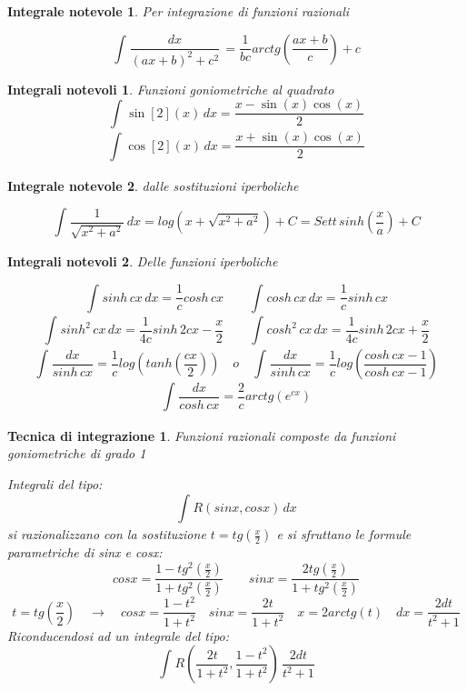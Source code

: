 \documentclass[a4paper, titlepage]{report}%
\theoremstyle{definition} %
\theoremstyle{plain}
\theoremstyle{plain}
\theoremstyle{remark}
\theoremstyle{remark}
\theoremstyle{plain}
\theoremstyle{plain}
\theoremstyle{plain}
\newtheorem*{integrale}{Integrale notevole}
\theoremstyle{plain}
\newtheorem*{integrali}{Integrali notevoli}
\theoremstyle{plain}
\newtheorem*{tecnica}{Tecnica di integrazione}
\begin{document}
\begin{integrale}{Per integrazione di funzioni razionali}

\[
    \int_{}^{} \frac{dx}{(ax+b)^2+c^2} \, = \frac{1}{bc} arctg(\frac{ax+b}{c}) + c
\]
\end{integrale}
\begin{integrali}{Funzioni goniometriche al quadrato}
\[
    \int_{}^{} \sin[2](x) \,dx = \frac{x-\sin(x)\cos(x)}{2}   
\]
\[
    \int_{}^{} \cos[2](x) \, dx = \frac{x+\sin(x)\cos(x)}{2}   
\]

\end{integrali}
\begin{integrale}{dalle sostituzioni iperboliche}
    
    \[
        \int_{}^{} \frac{1}{\sqrt{x^2+ a^2}} \,dx = 
        log(x+ \sqrt{x^2+a^2}) + C = Sett \,sinh(\frac{x}{a}) + C
    \]

\end{integrale}
\begin{integrali}{Delle funzioni iperboliche}
    
    \[
        \int_{}^{} sinh \, cx \, dx = \frac{1}{c} cosh \, cx
        \qquad         
        \int_{}^{} cosh \, cx \, dx = \frac{1}{c} sinh \, cx
    \]
    \[
        \int_{}^{} sinh^2 \, cx \, dx = \frac{1}{4c} sinh \, 2cx -\frac{x}{2}
        \qquad
        \int_{}^{} cosh^2 \, cx \, dx = \frac{1}{4c} sinh \, 2cx +\frac{x}{2}
    \]
    \[
        \int_{}^{} \frac{dx}{sinh \, cx} = \frac{1}{c} log(tanh(\frac{cx}{2}))
        \quad o \quad 
        \int_{}^{} \frac{dx}{sinh \, cx} = \frac{1}{c} log(\frac{cosh \, cx -1}{cosh \, cx -1})
    \]
    \[
        \int_{}^{} \frac{dx}{cosh \, cx} = \frac{2}{c} arctg(e^{cx})  
    \]

\end{integrali}

\begin{tecnica}{Funzioni razionali composte da funzioni goniometriche di grado 1}
   
    Integrali del tipo:
\[
     \int_{}^{} R(sinx,cosx) \,dx         
\]
si razionalizzano con la sostituzione $t = tg(\frac{x}{2})$ e si sfruttano le formule parametriche
di sinx e cosx:
\[
    cosx = \frac{1-tg^2(\frac{x}{2})}{1+tg^2(\frac{x}{2})}    
    \qquad sinx = \frac{2tg(\frac{x}{2})}{1+tg^2(\frac{x}{2})}
\]
\[
  t = tg(\frac{x}{2}) \quad \rightarrow \quad cosx = \frac{1-t^2}{1+t^2} \quad sinx = \frac{2t}{1+t^2}
  \quad x = 2 arctg(t) \quad dx = \frac{2dt}{t^2 +1}
\]
Riconducendosi ad un integrale del tipo:
\[
    \int_{}^{} R(\frac{2t}{1+t^2},\frac{1-t^2}{1+t^2}) \,\frac{2dt}{t^2+1}  
\]
\end{tecnica}
\end{document}
